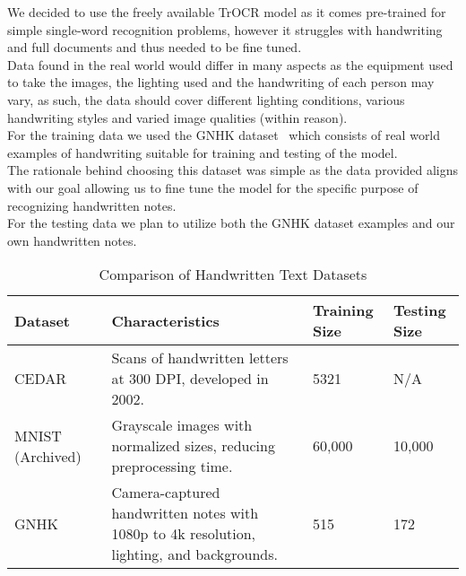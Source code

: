 \documentclass[twoside,a4paper]{article}
\begin{document}
We decided to use the freely available TrOCR model as it comes pre-trained for simple single-word recognition problems, however it struggles with handwriting and full documents and thus needed to be fine tuned.\\
Data found in the real world would differ in many aspects as the equipment used to take the images, the lighting used and the handwriting of each person may vary, as such, the data should cover different lighting conditions, various handwriting styles and varied image qualities (within reason). \\
For the training data we used the GNHK dataset~\cite{Lee2021} which consists of real world examples of handwriting suitable for training and testing of the model. \\
The rationale behind choosing this dataset was simple as the data provided aligns with our goal allowing us to fine tune the model for the specific purpose of recognizing handwritten notes.\\
For the testing data we plan to utilize both the GNHK dataset examples and our own handwritten notes.
\newpage
\begin{table}[!ht]
    \centering
    \renewcommand{\arraystretch}{1.3} %
    \begin{tabular}{|p{3cm}|p{5cm}|p{2.5cm}|p{2.5cm}|}
    \hline
        \textbf{Dataset} & \textbf{Characteristics} & \textbf{Training Size} & \textbf{Testing Size} \\ \hline
        CEDAR~\cite{CEDAR_Dataset} & Scans of handwritten letters at 300 DPI, developed in 2002. & 5321 & N/A \\ \hline
        MNIST (Archived)~\cite{MNIST_Dataset} & Grayscale images with normalized sizes, reducing preprocessing time. & 60,000 & 10,000 \\ \hline
        GNHK~\cite{Lee2021s} & Camera-captured handwritten notes with 1080p to 4k resolution, lighting, and backgrounds. & 515 & 172 \\ \hline
    \end{tabular}
    \caption{Comparison of Handwritten Text Datasets}
    \label{tab:datasets}
\end{table}
\end{document}
